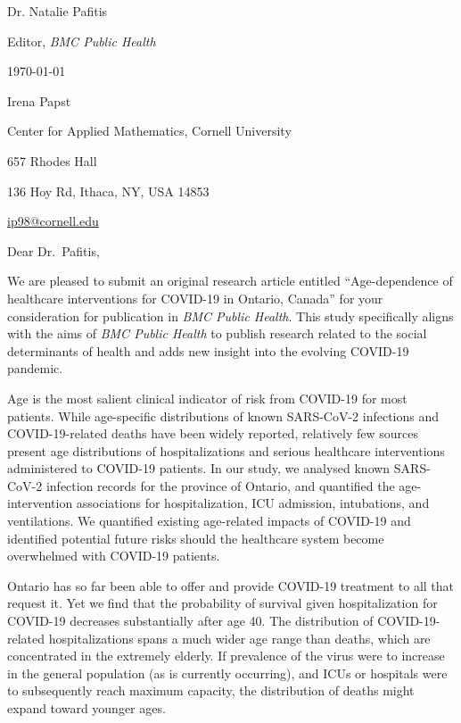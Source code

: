 \documentclass[12pt,letterpaper]{letter}
\newcommand{\journalname}{\emph{BMC Public Health}}
\begin{document}
\begin{multicols}{2}
\footnotesize
\begin{flushleft}

Dr. Natalie Pafitis

Editor, \journalname{}

\vfill

{\normalsize \mydate
\today}
\end{flushleft}

\columnbreak

\begin{flushright}
Irena Papst

Center for Applied Mathematics, Cornell University

657 Rhodes Hall

136 Hoy Rd, Ithaca, NY, USA 14853

\href{mailto:ip98@cornell.edu}{ip98@cornell.edu}
\end{flushright}

\end{multicols}

\setlength{\parskip}{1em}
\thispagestyle{empty}

\vspace{-1em}

Dear Dr.\ Pafitis,

We are pleased to submit an original research article entitled
``Age-dependence of healthcare interventions for COVID-19 in Ontario,
Canada'' for your consideration for publication in \journalname{}. This study specifically aligns with the aims of \journalname{} to publish research related to the social determinants of health and adds new insight into the evolving COVID-19 pandemic.

Age is the most salient clinical indicator of risk from COVID-19 for
most patients. While age-specific distributions of known SARS-CoV-2
infections and COVID-19-related deaths have been widely reported,
relatively few sources present age distributions of hospitalizations
and serious healthcare interventions administered to COVID-19
patients. In our study, we analysed known SARS-CoV-2 infection
records for the province of Ontario, and quantified the age-intervention associations
for hospitalization, ICU admission, intubations, and ventilations. We
quantified existing age-related impacts of COVID-19 and identified
potential future risks should the healthcare system become overwhelmed
with COVID-19 patients.

Ontario has so far been able to offer and provide COVID-19 treatment
to all that request it. Yet we find that the probability of survival
given hospitalization for COVID-19 decreases substantially after age
40. The distribution of COVID-19-related hospitalizations spans a much
wider age range than deaths, which are concentrated in the extremely
elderly. If prevalence of the virus were to increase in the general
population (as is currently occurring), and ICUs or hospitals were to
subsequently reach maximum capacity, the distribution of deaths might expand toward younger ages.
\end{document}
